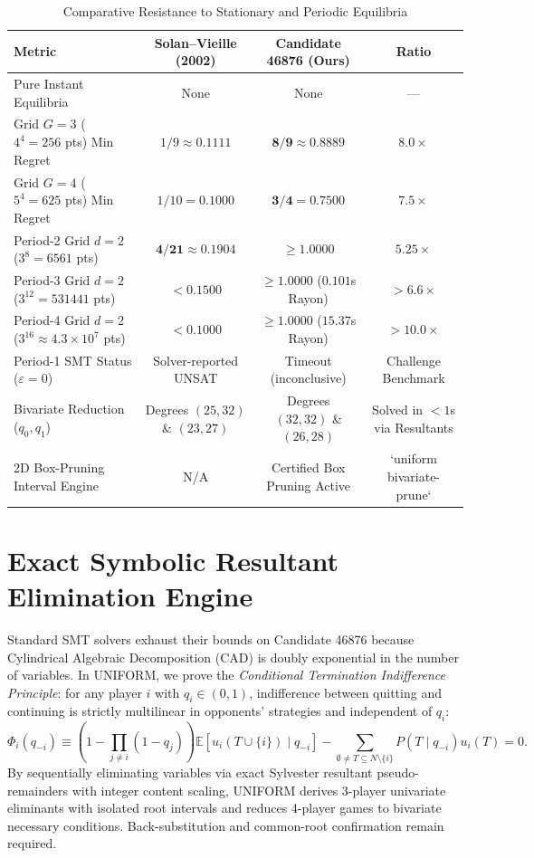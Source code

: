 \documentclass[11pt,a4paper]{article}
\theoremstyle{definition}
\begin{document}
\begin{table}[h]
\centering
\caption{Comparative Resistance to Stationary and Periodic Equilibria}
\begin{tabular}{lccc}
\toprule
Metric & Solan--Vieille (2002) & Candidate 46876 (Ours) & Ratio \\
\midrule
Pure Instant Equilibria & None & None & --- \\
Grid $G=3$ ($4^4=256$ pts) Min Regret & $1/9 \approx 0.1111$ & $\mathbf{8/9 \approx 0.8889}$ & $\mathbf{8.0\times}$ \\
Grid $G=4$ ($5^4=625$ pts) Min Regret & $1/10 = 0.1000$ & $\mathbf{3/4 = 0.7500}$ & $\mathbf{7.5\times}$ \\
Period-2 Grid $d=2$ ($3^8=6561$ pts) & $\mathbf{4/21 \approx 0.1904}$ & $\mathbf{\ge 1.0000}$ & $\mathbf{5.25\times}$ \\
Period-3 Grid $d=2$ ($3^{12}=531441$ pts) & $< 0.1500$ & $\mathbf{\ge 1.0000}$ ($0.101$s Rayon) & $\mathbf{>6.6\times}$ \\
Period-4 Grid $d=2$ ($3^{16} \approx 4.3 \times 10^7$ pts) & $< 0.1000$ & $\mathbf{\ge 1.0000}$ ($15.37$s Rayon) & $\mathbf{>10.0\times}$ \\
Period-1 SMT Status ($\varepsilon = 0$) & Solver-reported UNSAT & Timeout (inconclusive) & Challenge Benchmark \\
Bivariate Reduction ($q_0, q_1$) & Degrees $(25, 32)$ \& $(23, 27)$ & Degrees $(32, 32)$ \& $(26, 28)$ & Solved in $<1$s via Resultants \\
2D Box-Pruning Interval Engine & N/A & Certified Box Pruning Active & `uniform bivariate-prune` \\
\bottomrule
\end{tabular}
\end{table}

\section{Exact Symbolic Resultant Elimination Engine}

Standard SMT solvers exhaust their bounds on Candidate 46876 because Cylindrical Algebraic Decomposition (CAD) is doubly exponential in the number of variables. In UNIFORM, we prove the \textit{Conditional Termination Indifference Principle}: for any player $i$ with $q_i \in (0, 1)$, indifference between quitting and continuing is strictly multilinear in opponents' strategies and independent of $q_i$:
\begin{equation}
\Phi_i(q_{-i}) \equiv \left(1 - \prod_{j \ne i}(1 - q_j)\right) \mathbb{E}[u_i(T \cup \{i\}) \mid q_{-i}] - \sum_{\emptyset \ne T \subseteq N \setminus \{i\}} P(T \mid q_{-i}) u_i(T) = 0.
\end{equation}
By sequentially eliminating variables via exact Sylvester resultant pseudo-remainders with integer content scaling, UNIFORM derives 3-player univariate eliminants with isolated root intervals and reduces 4-player games to bivariate necessary conditions. Back-substitution and common-root confirmation remain required.
\end{document}

